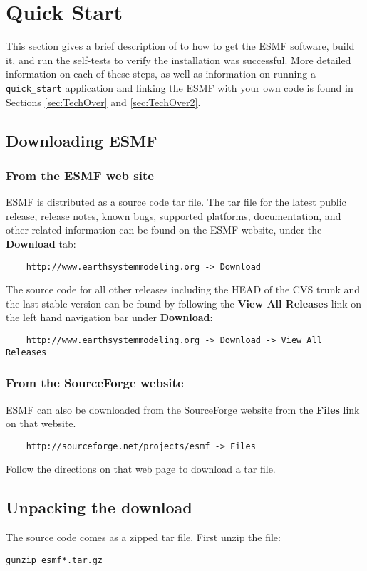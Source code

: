 \section{Quick Start}
\label{sec:QuickStart}

This section gives a brief
description of to how to get the ESMF software, build it, 
and run the self-tests to verify the installation was successful.
More detailed information on each of these steps, as well as
information on running a {\tt quick\_start} application and linking
the ESMF with your own code is found in Sections \ref{sec:TechOver} 
and \ref{sec:TechOver2}.  

\subsection{Downloading ESMF}
\subsubsection{From the ESMF web site}
\label{sec:download}
ESMF is distributed as a source code tar file.  The tar file for the latest
public release, release notes, 
known bugs, supported platforms, documentation, and other related information 
can be found on the ESMF website, under the {\bf Download} tab:
\begin{verbatim}
    http://www.earthsystemmodeling.org -> Download
\end{verbatim}
The source code for all other releases including the HEAD of the CVS trunk and the
last stable version can be found by following the {\bf View All Releases} link on the left hand navigation bar under {\bf Download}:
\begin{verbatim}
    http://www.earthsystemmodeling.org -> Download -> View All Releases
\end{verbatim}

\subsubsection{From the SourceForge website}
ESMF can also be downloaded from the SourceForge website
from the {\bf Files} link on that website.
\begin{verbatim}
    http://sourceforge.net/projects/esmf -> Files
\end{verbatim}
Follow the directions on that web page to download a tar file.  

\subsection{Unpacking the download}
The source code comes as a zipped tar file. First unzip the file:
\begin{verbatim}
gunzip esmf*.tar.gz
\end{verbatim}

